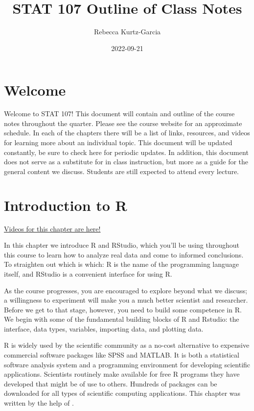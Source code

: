 \documentclass[
]{book}
\title{STAT 107 Outline of Class Notes}
\author{Rebecca Kurtz-Garcia}
\date{2022-09-21}
\begin{document}
\maketitle

{
\setcounter{tocdepth}{1}
\tableofcontents
}
\hypertarget{welcome}{%
\chapter*{Welcome}\label{welcome}}

Welcome to STAT 107! This document will contain and outline of the course notes throughout the quarter. Please see the course website for an approximate schedule. In each of the chapters there will be a list of links, resources, and videos for learning more about an individual topic. This document will be updated constantly, be sure to check here for periodic updates. In addition, this document does not serve as a substitute for in class instruction, but more as a guide for the general content we discuss. Students are still expected to attend every lecture.

\hypertarget{introduction-to-r}{%
\chapter{Introduction to R}\label{introduction-to-r}}

\href{https://drive.google.com/drive/folders/1wqLcBREQ3wahLH6Z7tAZEjxz11cFkgN2?usp=sharing}{Videos for this chapter are here!}

In this chapter we introduce R and RStudio, which you'll be using throughout this course to learn how to analyze real data and come to informed conclusions. To straighten out which is which: R is the name of the programming language itself, and RStudio is a convenient interface for using R.

As the course progresses, you are encouraged to explore beyond what we discuss; a willingness to experiment will make you a much better scientist and researcher. Before we get to that stage, however, you need to build some competence in R. We begin with some of the fundamental building blocks of R and Rstudio: the interface, data types, variables, importing data, and plotting data.

R is widely used by the scientific community as a no-cost alternative to expensive commercial software packages like SPSS and MATLAB. It is both a statistical software analysis system and a programming environment for developing scientific applications. Scientists routinely make available for free R programs they have developed that might be of use to others. Hundreds of packages can be downloaded for all types of scientific computing applications. This chapter was written by the help of \citet{Desharnais2020}.
\end{document}
